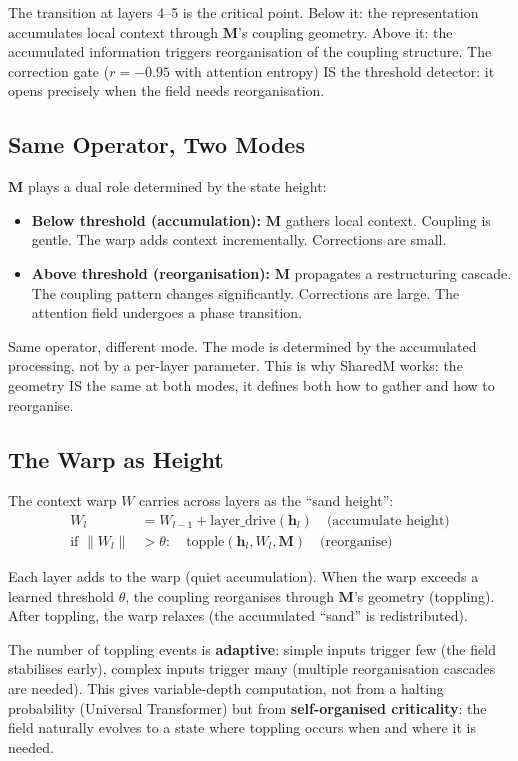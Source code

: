 \documentclass[11pt, a4paper]{article}
\newcommand{\M}{\mathbf{M}}
\newcommand{\h}{\mathbf{h}}
\theoremstyle{plain}
\theoremstyle{definition}
\theoremstyle{remark}
\begin{document}
The transition at layers 4--5 is the critical point.
Below it: the representation accumulates local context through $\M$'s coupling geometry.
Above it: the accumulated information triggers reorganisation of the coupling structure.
The correction gate ($r = -0.95$ with attention entropy) IS the threshold detector: it opens precisely when the field needs reorganisation.

\subsection{Same Operator, Two Modes}

$\M$ plays a dual role determined by the state height:
\begin{itemize}[nosep]
\item \textbf{Below threshold (accumulation):} $\M$ gathers local context. Coupling is gentle. The warp adds context incrementally. Corrections are small.
\item \textbf{Above threshold (reorganisation):} $\M$ propagates a restructuring cascade. The coupling pattern changes significantly. Corrections are large. The attention field undergoes a phase transition.
\end{itemize}

Same operator, different mode.
The mode is determined by the accumulated processing, not by a per-layer parameter.
This is why SharedM works: the geometry IS the same at both modes, it defines both how to gather and how to reorganise.

\subsection{The Warp as Height}

The context warp $W$ carries across layers as the ``sand height'':
\begin{align}
W_{l} &= W_{l-1} + \text{layer\_drive}(\h_l) \quad \text{(accumulate height)} \\
\text{if } \|W_l\| &> \theta: \quad \text{topple}(\h_l, W_l, \M) \quad \text{(reorganise)}
\end{align}

Each layer adds to the warp (quiet accumulation).
When the warp exceeds a learned threshold $\theta$, the coupling reorganises through $\M$'s geometry (toppling).
After toppling, the warp relaxes (the accumulated ``sand'' is redistributed).

The number of toppling events is \textbf{adaptive}: simple inputs trigger few (the field stabilises early), complex inputs trigger many (multiple reorganisation cascades are needed).
This gives variable-depth computation, not from a halting probability (Universal Transformer) but from \textbf{self-organised criticality}: the field naturally evolves to a state where toppling occurs when and where it is needed.
\end{document}
